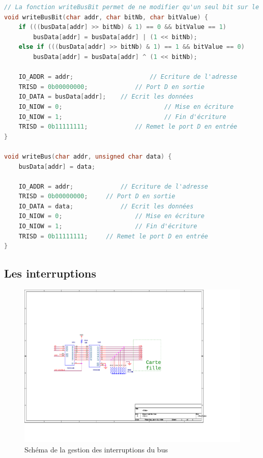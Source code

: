 \documentclass[a4paper]{article}
\begin{document}
\begin{lstlisting}[caption=Implémentation en C pour l'écriture sur le bus, label=Implementation_en_C_pour_ecriture_sur_le_bus, language=c]
// La fonction writeBusBit permet de ne modifier qu'un seul bit sur le bus et demande pour cela de stocker en mémoire pour chaque adresse l'état du bus.
void writeBusBit(char addr, char bitNb, char bitValue) {
	if (((busData[addr] >> bitNb) & 1) == 0 && bitValue == 1)
		busData[addr] = busData[addr] | (1 << bitNb);
	else if (((busData[addr] >> bitNb) & 1) == 1 && bitValue == 0)
		busData[addr] = busData[addr] ^ (1 << bitNb);

	IO_ADDR = addr;						// Ecriture de l'adresse
	TRISD = 0b00000000;				// Port D en sortie
	IO_DATA = busData[addr];	// Ecrit les données
	IO_NIOW = 0;							// Mise en écriture
	IO_NIOW = 1;							// Fin d'écriture
	TRISD = 0b11111111;				// Remet le port D en entrée
}

void writeBus(char addr, unsigned char data) {
	busData[addr] = data;

	IO_ADDR = addr;				// Ecriture de l'adresse
	TRISD = 0b00000000;		// Port D en sortie
	IO_DATA = data;				// Ecrit les données
	IO_NIOW = 0;					// Mise en écriture
	IO_NIOW = 1;					// Fin d'écriture
	TRISD = 0b11111111;		// Remet le port D en entrée
}
\end{lstlisting}

\subsection{Les interruptions}

\begin{figure}[H]
	\centering
	\includegraphics[scale=1.00]{Images/Montage_bus_interruptions}
	\caption{Schéma de la gestion des interruptions du bus
		\label{Montage_bus_interruptions}}
\end{figure}
\end{document}
